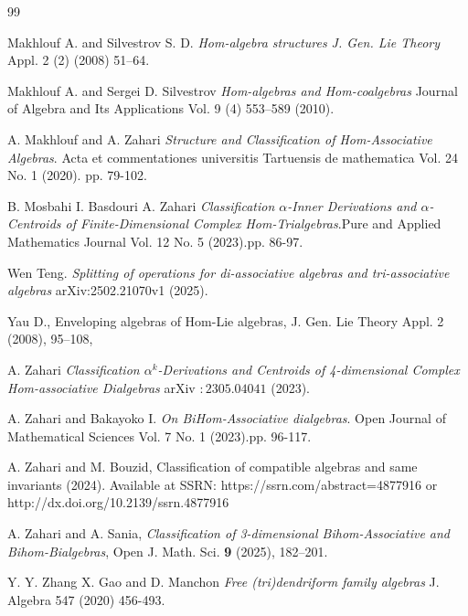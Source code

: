 \documentclass[11pt,twoside,reqno]{amsart}
\theoremstyle{plain}
\theoremstyle{definition}
\begin{document}
\begin{thebibliography}{99}
	
 Makhlouf A. and Silvestrov S. D. {\it Hom-algebra structures  J. Gen. Lie Theory} Appl. 2 (2)   (2008) 51–64.



 Makhlouf A. and  Sergei D. Silvestrov {\it Hom-algebras and Hom-coalgebras}  Journal of Algebra and Its Applications Vol. 9 (4)  553–589 (2010).

 A. Makhlouf and A.  Zahari  {\it Structure and Classification of Hom-Associative Algebras}. Acta et commentationes universitis Tartuensis de mathematica  Vol. 24  No. 1 (2020). pp. 79-102.


 B. Mosbahi   I. Basdouri  A. Zahari {\it Classification  $\alpha$-Inner Derivations and $\alpha$-Centroids of Finite-Dimensional Complex Hom-Trialgebras}.Pure and Applied Mathematics Journal  Vol. 12  No. 5 (2023).pp. 86-97.

  Wen Teng.  {\it Splitting of operations for di-associative algebras and tri-associative algebras} arXiv:2502.21070v1 (2025).


Yau D., Enveloping algebras of Hom-Lie algebras, J. Gen. Lie Theory Appl. 2 (2008), 95–108,


 A. Zahari {\it Classification  $\alpha^k$-Derivations and Centroids of 4-dimensional Complex Hom-associative Dialgebras}  arXiv $: 2305.04041$ (2023).


 A. Zahari and Bakayoko  I. {\it On BiHom-Associative dialgebras}.  Open Journal of Mathematical Sciences  Vol. 7  No. 1 (2023).pp. 96-117.


A. Zahari and M. Bouzid, Classification of compatible algebras and same invariants (2024). Available at SSRN: https://ssrn.com/abstract=4877916 or
http://dx.doi.org/10.2139/ssrn.4877916


A. Zahari and A. Sania, \textit{Classification of 3-dimensional Bihom-Associative and Bihom-Bialgebras}, Open J. Math. Sci. \textbf{9} (2025), 182--201.


 Y. Y. Zhang  X. Gao and D. Manchon  {\it Free (tri)dendriform family algebras}  J. Algebra 547 (2020)  456-493.


\end{thebibliography} 
\end{document}
